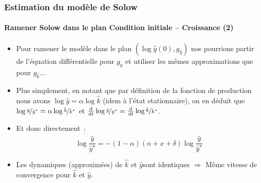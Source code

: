 \documentclass[10pt,notheorems]{beamer}
\theoremstyle{plain}
\theoremstyle{definition} %
\begin{document}
\begin{frame}
  \frametitle{Estimation du modèle de Solow}
  \framesubtitle{Ramener Solow dans le plan Condition initiale -- Croissance (2)}

  \begin{itemize}

  \item Pour ramener le modèle dans le plan $(\log \hat y(0), g_{\hat y})$ nos pourrions partir de l'équation différentielle pour $g_{\hat y}$ et utiliser les mêmes approximations que pour $g_{\hat k}$... \newline

  \item Plus simplement, en notant que par définition de la fonction de production nous avons $\log\hat y = \alpha\log\hat k$ (idem à l'état stationnaire), on en déduit que $\log \nicefrac{\hat y}{\hat y^{\star}} = \alpha \log \nicefrac{\hat k}{\hat k^{\star}}$ et $\frac{\mathrm d}{\mathrm dt}\log\nicefrac{\hat y}{\hat y^{\star}} = \frac{\mathrm d}{\mathrm dt}\log\nicefrac{\hat k}{\hat k^{\star}}$.\newline

  \item Et donc directement~:
    \[
      \dot{\log\frac{\hat y}{\hat y^{\star}}} = -(1-\alpha)(n+x+\delta)\log\frac{\hat y}{\hat y^{\star}}
    \]

    \bigskip

  \item Les dynamiques (approximées) de $\hat k$ et $\hat y$sont identiques $\Longrightarrow$ Même vitesse de convergence pour $\hat k$ et $\hat y$.

  \end{itemize}

\end{frame}
\end{document}
